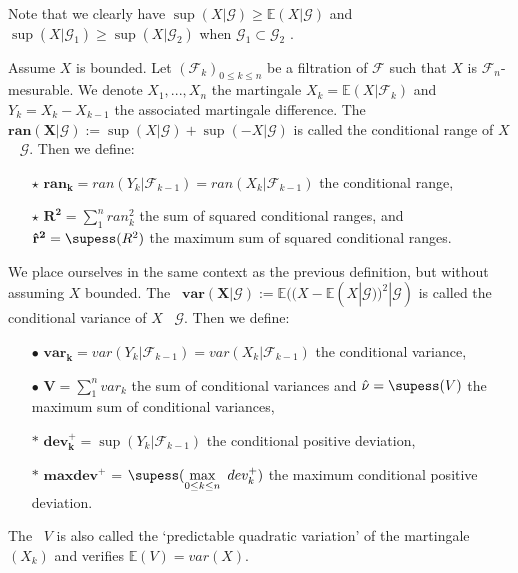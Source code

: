 Note that we clearly have $\sup(X|\mathcal{G}) \geq \mathbb{E}(X|\mathcal{G}) $ and  $\sup(X|\mathcal{G}_1) \geq  \sup(X|\mathcal{G}_2) $ when  $ \mathcal{G}_1 \subset \mathcal{G}_2$ .


\begin{definition}
\label{defpreli1}
Assume $X$ is bounded. Let $(\mathcal{F}_k)_{0\leq k \leq n}$ be a filtration of $\mathcal{F}$ such that $X$ is $\mathcal{F}_n$-mesurable. We denote $X_1,...,X_n$ the martingale $X_k=\mathbb{E}(X|\mathcal{F}_k)$ and $Y_k=X_k - X_{k-1}$ the associated martingale difference. The \rv~$\mathbf{ran(X \vert \mathcal{G})} := \sup(X | \mathcal{G}) + \sup(-X \vert \mathcal{G}) $ is called the conditional range of $X$ \wrt~ $\mathcal{G}$. Then we define:
\begin{itemize}
\item [$\star$] $ \mathbf{ran_k} = ran (Y_k|\mathcal{F}_{k-1}) = ran(X_k|\mathcal{F}_{k-1})$ the conditional range,
\item [$\star$] $\mathbf{R^2} = \sum_{1}^{n} ran_k^2$  the sum of squared conditional ranges, and $\mathbf{\hat{r}^2} = \supess(R^2)$ the maximum sum of squared conditional ranges.
\end{itemize}
\end{definition}

\begin{definition}
We place ourselves in the same context as the previous definition, but without assuming $X$ bounded. The \rv~$\mathbf{var(X|\mathcal{G})} := \mathbb{E}((X-\mathbb{E}(X|\mathcal{G}))^2|\mathcal{G}) $ is called the conditional variance of $X$ \wrt~$\mathcal{G}$. Then we define:
\begin{itemize}
\item [$\bullet$] $\mathbf{var_k} = var(Y_k|\mathcal{F}_{k-1})=var(X_k|\mathcal{F}_{k-1})$ the conditional variance, 
\item [$\bullet$] $\mathbf{V} = \sum_{1}^{n} var_k$ the sum of conditional variances and $\hat\nu= \supess(V)$ the maximum sum of conditional variances,
\item [$\ast$] $\mathbf{dev_k^+} = \sup(Y_k|\mathcal{F}_{k-1})$ the conditional positive deviation,
\item  [$\ast$] $\mathbf{maxdev^+} $ = $ \supess(\displaystyle\max_{0 \leq k \leq n}~ dev_k^+)$  the maximum conditional positive deviation.
\end{itemize}
\end{definition}

The \rv~$V$ is also called the `predictable quadratic variation' of the martingale $(X_k)$ and verifies $\mathbb{E}(V)= var(X)$.


